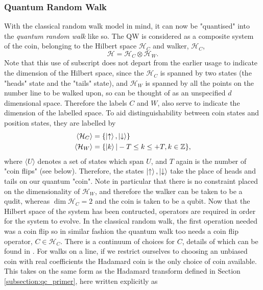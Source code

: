 \subsubsection{Quantum Random Walk}
\label{subsubsection:q_r_w}
With the classical random walk model in mind, it can now be "quantised" into the \emph{quantum random walk} like so.
The QW is considered as a composite system of the coin, belonging to the Hilbert space $\mathcal{H}_C$ and walker, $\mathcal{H}_C$,
\begin{equation}
    \mathcal{H} = \mathcal{H}_C \otimes \mathcal{H}_W.
\end{equation}
Note that this use of subscript does not depart from the earlier usage to indicate the dimension of the Hilbert space, since the $\mathcal{H}_C$ is spanned by two states (the "heads" state and the "tails" state), and $\mathcal{H}_W$ is spanned by all the points on the number line to be walked upon, so can be thought of as an unspecified $d$ dimensional space.
Therefore the labels $C$ and $W$, also serve to indicate the dimension of the labelled space.\newline
To aid distinguishability between coin states and position states, they are labelled by
\begin{align}
    \langle\mathcal{H}_C\rangle &= \{\ket{\uparrow}, \ket{\downarrow}\}\\
    \langle\mathcal{H}_W\rangle &= \{\ket{k} | -T\leq k \leq +T, k\in\mathbb{Z}\},
\end{align}
where $\langle U \rangle$ denotes a set of states which span $U$, and $T$ again is the number of "coin flips" (see below). 
Therefore, the states $\ket{\uparrow}, \ket{\downarrow}$ take the place of heads and tails on our quantum "coin". 
Note in particular that there is no constraint placed on the dimensionality of $\mathcal{H}_W$, and therefore the walker can be taken to be a qudit, whereas $\dim{\mathcal{H}_C} = 2$ and the coin is taken to be a qubit.
Now that the Hilbert space of the system has been contructed, operators are required in order for the system to evolve.
In the classical random walk, the first operation needed was a coin flip so in similar fashion the quantum walk too needs a coin flip operator, $C\in \mathcal{H}_C$. 
There is a continuum of choices for $C$, details of which can be found in \cite{Tregenna2003}. 
For walks on a line, if we restrict ourselves to choosing an unbiased coin with real coefficients the Hadamard coin is the only choice of coin available.
This takes on the same form as the Hadamard transform defined in Section \ref{subsection:qc_primer}, here written explicitly as
